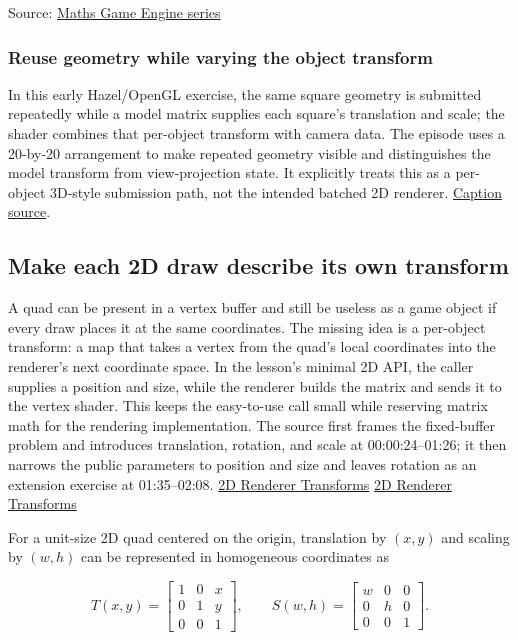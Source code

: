 Source: \href{https://www.youtube.com/watch?v=Idr1G1KyPNg}{Maths \textbar{} Game Engine series}

\subsubsection{Reuse geometry while varying the object transform}\label{06-engine-ii-ch025-reuse-geometry-while-varying-the-object-transform}

In this early Hazel/OpenGL exercise, the same square geometry is submitted repeatedly while a model matrix supplies each square's translation and scale; the shader combines that per-object transform with camera data. The episode uses a 20-by-20 arrangement to make repeated geometry visible and distinguishes the model transform from view-projection state. It explicitly treats this as a per-object 3D-style submission path, not the intended batched 2D renderer. \href{https://www.youtube.com/watch?v=cbB2fh0UxZ0}{Caption source}.

\subsection{Make each 2D draw describe its own transform}\label{06-engine-ii-ch025-make-each-2d-draw-describe-its-own-transform}

A quad can be present in a vertex buffer and still be useless as a game object if every draw places it at the same coordinates. The missing idea is a per-object transform: a map that takes a vertex from the quad's local coordinates into the renderer's next coordinate space. In the lesson's minimal 2D API, the caller supplies a position and size, while the renderer builds the matrix and sends it to the vertex shader. This keeps the easy-to-use call small while reserving matrix math for the rendering implementation. The source first frames the fixed-buffer problem and introduces translation, rotation, and scale at 00:00:24--01:26; it then narrows the public parameters to position and size and leaves rotation as an extension exercise at 01:35--02:08. \href{https://www.youtube.com/watch?v=-Qt12lcAF0Y&t=24s}{2D Renderer Transforms} \href{https://www.youtube.com/watch?v=-Qt12lcAF0Y&t=95s}{2D Renderer Transforms}

For a unit-size 2D quad centered on the origin, translation by \((x,y)\) and scaling by \((w,h)\) can be represented in homogeneous coordinates as

\[
T(x,y)=\begin{bmatrix}1&0&x\\0&1&y\\0&0&1\end{bmatrix},\qquad
S(w,h)=\begin{bmatrix}w&0&0\\0&h&0\\0&0&1\end{bmatrix}.
\]

